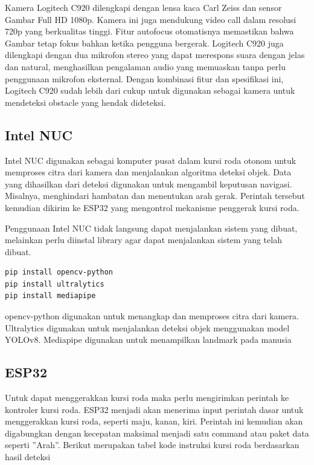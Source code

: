 Kamera Logitech C920 dilengkapi dengan lensa kaca Carl Zeiss dan sensor Gambar Full HD 1080p. Kamera ini juga mendukung video call dalam resolusi 720p yang berkualitas tinggi. Fitur autofocus otomatisnya memastikan bahwa Gambar tetap fokus bahkan ketika pengguna bergerak. Logitech C920 juga dilengkapi dengan dua mikrofon stereo yang dapat merespons suara dengan jelas dan natural, menghasilkan pengalaman audio yang memuaskan tanpa perlu penggunaan mikrofon eksternal. Dengan kombinasi fitur dan spesifikasi ini, Logitech C920 sudah lebih dari cukup untuk digunakan sebagai kamera untuk mendeteksi obstacle  yang hendak dideteksi.

\subsection{Intel NUC}
Intel NUC digunakan sebagai komputer pusat dalam kursi roda otonom untuk memproses citra dari kamera dan menjalankan algoritma deteksi objek. Data yang dihasilkan dari deteksi digunakan untuk mengambil keputusan navigasi. Misalnya, menghindari hambatan dan menentukan arah gerak. Perintah tersebut kemudian dikirim ke ESP32 yang mengontrol mekanisme penggerak kursi roda.

Penggunaan Intel NUC tidak langsung dapat menjalankan sistem yang dibuat, melainkan perlu diinstal library agar dapat menjalankan sistem yang telah dibuat.

\begin{lstlisting}
pip install opencv-python
pip install ultralytics
pip install mediapipe

\end{lstlisting}
opencv-python digunakan untuk menangkap dan memproses citra dari kamera. Ultralytics digunakan untuk menjalankan deteksi objek menggunakan model YOLOv8. Mediapipe digunakan untuk menampilkan landmark pada manusia
\subsection{ESP32}
Untuk dapat menggerakkan kursi roda maka perlu mengirimkan perintah ke kontroler kursi roda. ESP32 menjadi akan menerima input perintah dasar untuk menggerakkan kursi roda, seperti maju, kanan, kiri. Perintah ini kemudian akan digabungkan dengan kecepatan maksimal menjadi satu command atau paket data seperti ”Arah”. Berikut merupakan tabel kode instruksi kursi roda berdasarkan hasil deteksi \parencite{ekatama2024perancangan}

